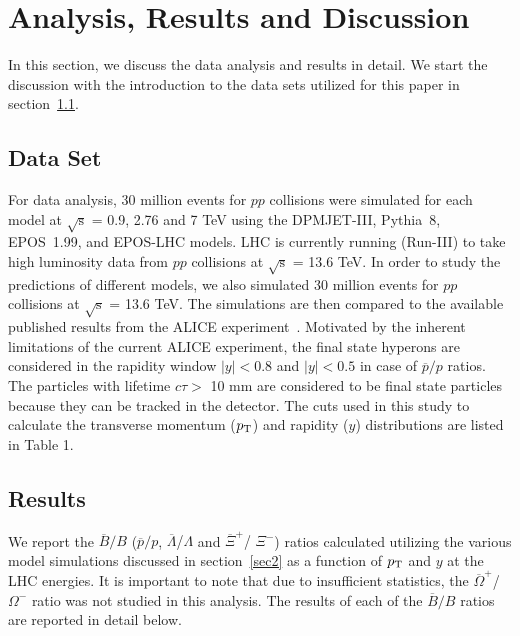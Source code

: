 \documentclass{article}
\newcommand{\sqrts}{\mbox{$\sqrt{\mathrm{s}}$}}
\newcommand{\axi}{$\overline{\Xi}^+$}
\newcommand{\xim}{$\Xi^-$}
\newcommand{\alam}{$\overline{\Lambda}$}
\newcommand{\lam}{$\Lambda$}
\newcommand{\omm}{$\Omega^-$}
\newcommand{\aom}{$\overline{\Omega}^+$}
\newcommand{\ppt}{$p_{\rm T}$}
\begin{document}
\section{Analysis, Results and Discussion}\label{sec3}
In this section, we  discuss the data analysis and results in detail. We start the discussion with the introduction to the data sets utilized for this paper in section~\ref{sec3-1}. 

\subsection{Data Set}\label{sec3-1}

For data analysis, 30 million events for $pp$ collisions were simulated for each model at {\sqrts} = 0.9, 2.76 and 7 TeV using the DPMJET-III, Pythia~8, EPOS~1.99, and EPOS-LHC models. LHC is currently running (Run-III) to take high luminosity data from $pp$ collisions at {\sqrts} = 13.6 TeV. In order to study the predictions of different models, we also simulated 30 million events for $pp$ collisions at {\sqrts} = 13.6 TeV. The simulations are then compared to the available published results from the ALICE experiment~\cite{20}. Motivated by the inherent limitations of the current ALICE experiment, the final state hyperons are considered in the rapidity window $|y| < 0.8$ and $|y| < 0.5$ in case of $\overline{p}/p$ ratios. The particles with lifetime $c\tau >$ 10 mm are considered to be final state particles because they can be tracked in the detector. The cuts used in this study to calculate the transverse momentum ({\ppt}) and rapidity ($y$) distributions are listed in Table 1.   



\subsection{Results}

We report the $\overline{B}/B$ ($\overline{p}/p$, {\alam /\lam} and {\axi / \xim}) ratios calculated utilizing the various model simulations discussed in section~\ref{sec2} as a function of {\ppt} and $y$ at the LHC energies. It is important to note that due to insufficient statistics, the {\aom / \omm} ratio was not studied in this analysis. The results of each of the $\overline{B}/B$ ratios are reported in detail below.
\end{document}
